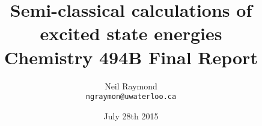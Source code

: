 \begin{titlepage}


\title{Semi-classical calculations of excited state energies
		\\\small Chemistry 494B Final Report}
\author{Neil Raymond
       \\ \texttt{ngraymon@uwaterloo.ca}}
\date{July 28th 2015}


\end{titlepage}